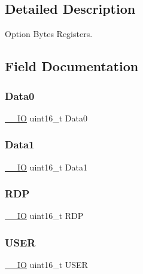 \subsection{Detailed Description}
Option Bytes Registers. 

\subsection{Field Documentation}
\mbox{\label{struct_o_b___type_def_a76b31b1239a451ee8f397289265bdf6b}} 
\subsubsection{\texorpdfstring{Data0}{Data0}}
{\footnotesize\ttfamily \mbox{\hyperlink{core__sc300_8h_aec43007d9998a0a0e01faede4133d6be}{\+\_\+\+\_\+\+IO}} uint16\+\_\+t Data0}

\mbox{\label{struct_o_b___type_def_aa081efb0cb15b6ffd486d23a89144142}} 
\subsubsection{\texorpdfstring{Data1}{Data1}}
{\footnotesize\ttfamily \mbox{\hyperlink{core__sc300_8h_aec43007d9998a0a0e01faede4133d6be}{\+\_\+\+\_\+\+IO}} uint16\+\_\+t Data1}

\mbox{\label{struct_o_b___type_def_ae708f301b866ad2a81ed39efba639aab}} 
\subsubsection{\texorpdfstring{RDP}{RDP}}
{\footnotesize\ttfamily \mbox{\hyperlink{core__sc300_8h_aec43007d9998a0a0e01faede4133d6be}{\+\_\+\+\_\+\+IO}} uint16\+\_\+t R\+DP}

\mbox{\label{struct_o_b___type_def_a67442d4e459bba2c40fa62914d78ec1e}} 
\subsubsection{\texorpdfstring{USER}{USER}}
{\footnotesize\ttfamily \mbox{\hyperlink{core__sc300_8h_aec43007d9998a0a0e01faede4133d6be}{\+\_\+\+\_\+\+IO}} uint16\+\_\+t U\+S\+ER}


